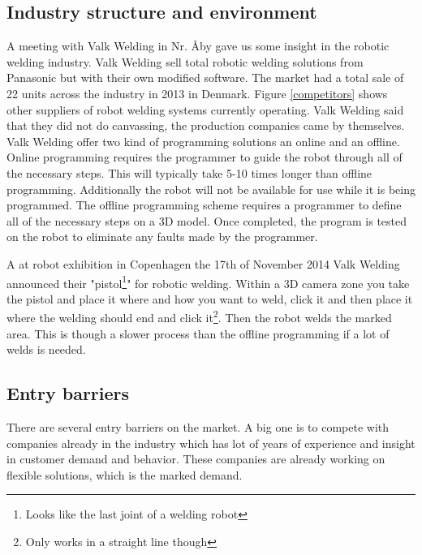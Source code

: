 \subsection{Industry structure and environment}
\label{ind.struc}
A meeting with Valk Welding in Nr. Åby gave us some insight in the robotic welding industry. Valk Welding sell total robotic welding solutions from Panasonic but with their own modified software. The market had a total sale of 22 units across the industry in 2013 in Denmark. Figure \ref{competitors} shows other suppliers of robot welding systems currently operating. Valk Welding said that they did not do canvassing, the production companies came by themselves. Valk Welding offer two kind of programming solutions an online and an offline. 
Online programming requires the programmer to guide the robot through all of the necessary steps. This will typically take 5-10 times longer than offline programming. Additionally the robot will not be available for use while it is being programmed. The offline programming scheme requires a programmer to define all of the necessary steps on a 3D model. Once completed, the program is tested on the robot to eliminate any faults made by the programmer.  

A at robot exhibition in Copenhagen the 17th of November 2014 Valk Welding announced their "pistol\footnote{Looks like the last joint of a welding robot}" for robotic welding. Within a 3D camera zone you take the pistol and place it where and how you want to weld, click it and then place it where the welding should end and click it\footnote{Only works in a straight line though}. Then the robot welds the marked area. This is though a slower process than the offline programming if a lot of welds is needed.
\subsection{Entry barriers}
There are several entry barriers on the market. A big one is to compete with companies already in the industry which has lot of years of experience and insight in customer demand and behavior. These companies are already working on flexible solutions, which is the marked demand. 
